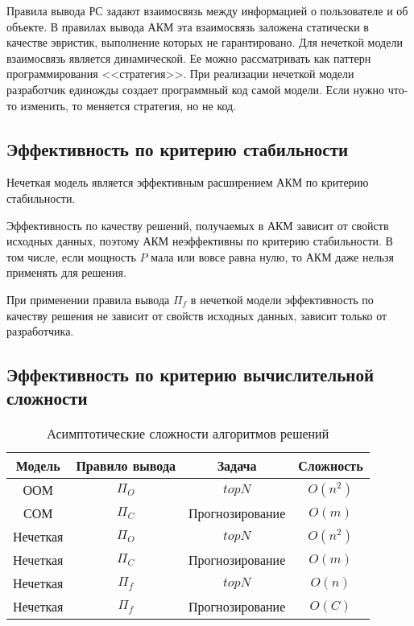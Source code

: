 Правила вывода РС задают взаимосвязь между информацией о пользователе и об
объекте. В правилах вывода
АКМ эта взаимосвязь заложена статически в качестве эвристик, выполнение
которых не гарантировано. Для нечеткой модели взаимосвязь является
динамической. Ее можно рассматривать как паттерн программирования
<<стратегия>>. При реализации нечеткой модели разработчик
единожды создает программный код самой модели. Если нужно что-то изменить,
то меняется стратегия, но не код.

\subsection{Эффективность по критерию стабильности}
\begin{trm}
	\label{trm:fuz-eff-extension-stab}
	Нечеткая модель является эффективным расширением АКМ
	по критерию стабильности.
\end{trm}

Эффективность по качеству решений, получаемых в АКМ зависит от свойств исходных
данных, поэтому АКМ неэффективны по критерию стабильности. В том числе, если
мощность $P$ мала или вовсе равна нулю, то АКМ даже нельзя применять для
решения.

При применении
правила вывода $\Pi_f$ в нечеткой модели эффективность по качеству решения
не зависит от свойств исходных данных, зависит только от разработчика.

\subsection{Эффективность по критерию вычислительной сложности}
  \begin{table}[h]
	  \begin{center}
		  \caption{Асимптотические сложности алгоритмов решений}
		  \label{ass-comp}
		  \begin{tabular}{|c|c|c|c|}
			  \hline
			  Модель   & Правило вывода & Задача & Сложность  \\ \hline
			  ООМ      & $\Pi_{O}$ & $topN$ & $O(n^2)$  \\ \hline
			  СОМ      & $\Pi_{C}$ &Прогнозирование & $O(m)$ \\ \hline
			  Нечеткая & $\Pi_{O}$ &$topN$ & $O(n^2)$  \\ \hline
			  Нечеткая & $\Pi_{C}$ &Прогнозирование & $O(m)$ \\ \hline
			  Нечеткая & $\Pi_{f}$ &$topN$ & $O(n)$  \\ \hline
			  Нечеткая & $\Pi_{f}$ &Прогнозирование & $O(C)$ \\ \hline
		  \end{tabular}
	  \end{center}
  \end{table}

